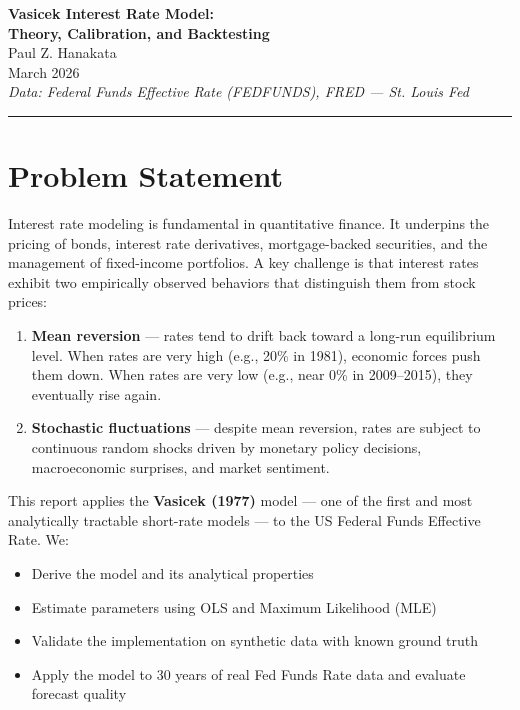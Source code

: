 \documentclass[11pt, letterpaper]{article}
\begin{document}
\begin{center}
  {\LARGE\bfseries Vasicek Interest Rate Model:\\[4pt]
    Theory, Calibration, and Backtesting}\\[12pt]
  {\large Paul Z. Hanakata}\\[4pt]
  {\normalsize March 2026}\\[2pt]
  {\normalsize\itshape
    Data: Federal Funds Effective Rate (FEDFUNDS), FRED --- St. Louis Fed}
\end{center}

\vspace{6pt}
\hrule
\vspace{10pt}

\tableofcontents
\newpage

\section{Problem Statement}

Interest rate modeling is fundamental in quantitative finance. It underpins the
pricing of bonds, interest rate derivatives, mortgage-backed securities, and the
management of fixed-income portfolios. A key challenge is that interest rates
exhibit two empirically observed behaviors that distinguish them from stock prices:

\begin{enumerate}
  \item \textbf{Mean reversion} --- rates tend to drift back toward a long-run
        equilibrium level. When rates are very high (e.g., 20\% in 1981),
        economic forces push them down. When rates are very low
        (e.g., near 0\% in 2009--2015), they eventually rise again.

  \item \textbf{Stochastic fluctuations} --- despite mean reversion, rates are
        subject to continuous random shocks driven by monetary policy decisions,
        macroeconomic surprises, and market sentiment.
\end{enumerate}

This report applies the \textbf{Vasicek (1977)} model --- one of the first and
most analytically tractable short-rate models --- to the US Federal Funds
Effective Rate. We:
\begin{itemize}
  \item Derive the model and its analytical properties
  \item Estimate parameters using OLS and Maximum Likelihood (MLE)
  \item Validate the implementation on synthetic data with known ground truth
  \item Apply the model to 30 years of real Fed Funds Rate data and evaluate
        forecast quality
\end{itemize}
\end{document}
